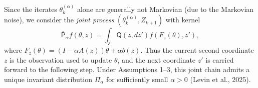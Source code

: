 Since the iterates $\theta_{k}^{(\alpha)}$ alone are generally not Markovian (due to the Markovian noise), we consider the \emph{joint process} $(\theta_{k}^{(\alpha)}, Z_{k+1})$ with kernel
\[
\overline{\mathsf{P}}_{\alpha} f(\theta, z)
  = \int_{\mathsf{Z}} \mathsf{Q}(z, d z') f(F_{z}(\theta), z'),
\]
where $F_{z} (\theta) = (I - \alpha A(z)) \theta + \alpha b(z)$. Thus the current
second coordinate $z$ is the observation used to update $\theta$, and the next
coordinate $z'$ is carried forward to the following step. Under Assumptions
1--3, this joint chain admits a unique invariant distribution $\Pi_{\alpha}$ for
sufficiently small $\alpha > 0$ (Levin et al., 2025).
